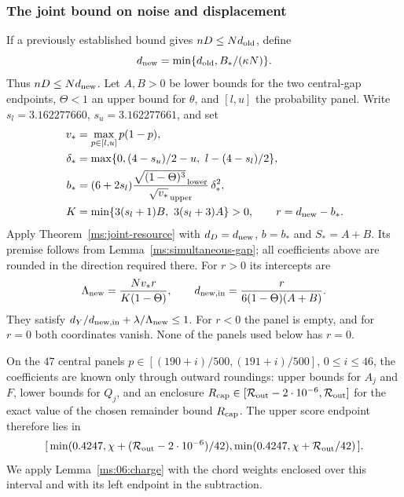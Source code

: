 \subsubsection{The joint bound on noise and displacement}
If a previously established bound gives $nD\le Nd_{\rm old}$, define
\[
 d_{\rm new}=\min\{d_{\rm old},B_*/(\kappa N)\}.
\]
Thus $nD\le N d_{\rm new}$. Let $A,B>0$ be lower bounds for the two central-gap endpoints,
$\Theta<1$ an upper bound for $\theta$, and $[l,u]$ the probability panel. Write $s_l=3.162277660$, $s_u=3.162277661$, and set
\begin{align*}
 v_*&=\max_{p\in[l,u]}p(1-p),\\
 \delta_*&=\max\{0,(4-s_u)/2-u,\ l-(4-s_l)/2\},\\
 b_*&=(6+2s_l)
   \frac{\sqrt{(1-\Theta)^3}_{\,\rm lower}}
        {\sqrt{v_*}_{\,\rm upper}}\,\delta_*^2,\\
 K&=\min\{3(s_l+1)B,\ 3(s_l+3)A\}>0,\qquad
 r=d_{\rm new}-b_* .
\end{align*}
Apply Theorem~\ref{ms:joint-resource} with $d_D=d_{\rm new}$,
$b=b_*$ and $S_*=A+B$. Its premise follows from
Lemma~\ref{ms:simultaneous-gap}; all coefficients above are rounded
in the direction required there. For $r>0$ its intercepts are
\[
 \Lambda_{\rm new}=\frac{Nv_*r}{K(1-\Theta)},\qquad
 d_{{\rm new,in}}=\frac{r}{6(1-\Theta)(A+B)}.
\]
They satisfy $d_Y/d_{{\rm new,in}}+\lambda/\Lambda_{\rm new}\le1$.
For $r<0$ the panel is empty, and for $r=0$ both coordinates vanish.
None of the panels used below has $r=0$.

On the $47$ central panels $p\in[(190+i)/500,(191+i)/500]$,
$0\le i\le46$, the coefficients are known only through outward roundings:
upper bounds for $A_j$ and $F$, lower bounds for $Q_j$, and an enclosure
$R_{\rm cap}\in[\mathcal R_{\rm out}-2\cdot10^{-6},\mathcal R_{\rm out}]$
for the exact value of the chosen remainder bound $R_{\rm cap}$.
The upper score endpoint therefore lies in
\[
 [\,\min(0.4247,\chi+(\mathcal R_{\rm out}-2\cdot10^{-6})/42),
    \min(0.4247,\chi+\mathcal R_{\rm out}/42)\,].
\]
We apply Lemma~\ref{ms:06:charge} with the chord weights enclosed over
this interval and with its left endpoint in the subtraction.

